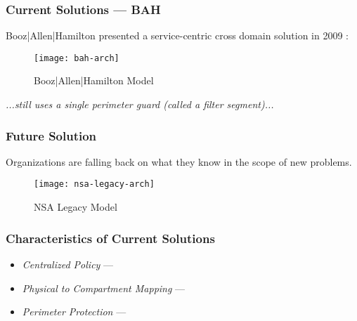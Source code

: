 \begin{frame}[t]
\frametitle{Current Solutions --- BAH}
Booz|Allen|Hamilton presented a service-centric cross domain solution in 2009 \cite{proposal:bah-arch}:
\begin{figure}[!t]
\centering
\texttt{[image: bah-arch]}
\caption{Booz|Allen|Hamilton Model}
\label{fig:model:conceptual-model}
\end{figure}
\textit{...still uses a single perimeter guard (called a filter segment)...}
\end{frame}

\begin{frame}[t]
\frametitle{Future Solution}
Organizations are falling back on what they know in the scope of new problems.
\begin{figure}[!t]
\centering
\texttt{[image: nsa-legacy-arch]}
\caption{NSA Legacy Model}
\label{fig:model:conceptual-model}
\end{figure}
\end{frame}

%
\begin{frame}
\frametitle{Characteristics of Current Solutions}
\begin{itemize}
\item<2-> \textit{Centralized Policy} ---
\item<3-> \textit{Physical to Compartment Mapping} ---
\item<4-> \textit{Perimeter Protection} ---
\end{itemize}
\end{frame}
